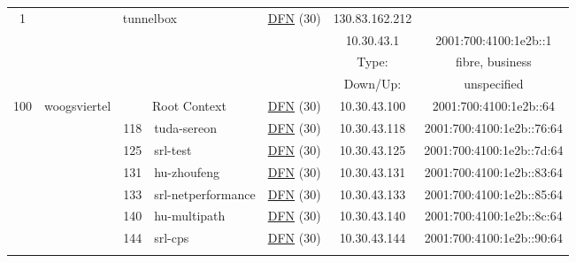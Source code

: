 \begin{small}
\begin{center}
\begin{longtable}{|c|c|c|c|c|c|c|c|}
\endhead
 \multirow{4}{*}{\tiny{1}} & \multicolumn{3}{|c|}{\multirow{4}{*}{\tiny{tunnelbox}}} & \multicolumn{2}{|c|}{\multirow{4}{*}{\tiny{\href{https://www.dfn.de}{DFN} (30)}}} & \tiny{130.83.162.212} & \frownie{} \\* \cline{7-7}\cline{8-8}
  & \multicolumn{3}{|c|}{} & \multicolumn{2}{|c|}{} & \tiny{10.30.43.1} & \tiny{2001:700:4100:1e2b::1} \\* \cline{7-7}\cline{8-8}
  & \multicolumn{3}{|c|}{} & \multicolumn{2}{|c|}{} & Type: & fibre, business \\* \cline{7-7}\cline{8-8}
  & \multicolumn{3}{|c|}{} & \multicolumn{2}{|c|}{} & Down/Up:  & unspecified \\ \hline
 \multirow{19}{*}{\tiny{100}} & \multicolumn{1}{|l|}{\multirow{19}{*}{\tiny{woogsviertel}}} & \multicolumn{2}{|c|}{\tiny{Root Context}} & \multicolumn{2}{|c|}{\tiny{\href{https://www.dfn.de}{DFN} (30)}} & \tiny{10.30.43.100} & \tiny{2001:700:4100:1e2b::64} \\* \cline{3-3}\cline{4-4}\cline{5-5}\cline{6-6}\cline{7-7}\cline{8-8}
  &  & \tiny{118} & \multicolumn{1}{|l|}{\tiny{tuda-sereon}} & \multicolumn{2}{|c|}{\tiny{\href{https://www.dfn.de}{DFN} (30)}} & \tiny{10.30.43.118} & \tiny{2001:700:4100:1e2b::76:64} \\* \cline{3-3}\cline{4-4}\cline{5-5}\cline{6-6}\cline{7-7}\cline{8-8}
  &  & \tiny{125} & \multicolumn{1}{|l|}{\tiny{srl-test}} & \multicolumn{2}{|c|}{\tiny{\href{https://www.dfn.de}{DFN} (30)}} & \tiny{10.30.43.125} & \tiny{2001:700:4100:1e2b::7d:64} \\* \cline{3-3}\cline{4-4}\cline{5-5}\cline{6-6}\cline{7-7}\cline{8-8}
  &  & \tiny{131} & \multicolumn{1}{|l|}{\tiny{hu-zhoufeng}} & \multicolumn{2}{|c|}{\tiny{\href{https://www.dfn.de}{DFN} (30)}} & \tiny{10.30.43.131} & \tiny{2001:700:4100:1e2b::83:64} \\* \cline{3-3}\cline{4-4}\cline{5-5}\cline{6-6}\cline{7-7}\cline{8-8}
  &  & \tiny{133} & \multicolumn{1}{|l|}{\tiny{srl-netperformance}} & \multicolumn{2}{|c|}{\tiny{\href{https://www.dfn.de}{DFN} (30)}} & \tiny{10.30.43.133} & \tiny{2001:700:4100:1e2b::85:64} \\* \cline{3-3}\cline{4-4}\cline{5-5}\cline{6-6}\cline{7-7}\cline{8-8}
  &  & \tiny{140} & \multicolumn{1}{|l|}{\tiny{hu-multipath}} & \multicolumn{2}{|c|}{\tiny{\href{https://www.dfn.de}{DFN} (30)}} & \tiny{10.30.43.140} & \tiny{2001:700:4100:1e2b::8c:64} \\* \cline{3-3}\cline{4-4}\cline{5-5}\cline{6-6}\cline{7-7}\cline{8-8}
  &  & \tiny{144} & \multicolumn{1}{|l|}{\tiny{srl-cps}} & \multicolumn{2}{|c|}{\tiny{\href{https://www.dfn.de}{DFN} (30)}} & \tiny{10.30.43.144} & \tiny{2001:700:4100:1e2b::90:64} \\* \cline{3-3}\cline{4-4}\cline{5-5}\cline{6-6}\cline{7-7}\cline{8-8}

\end{longtable}
\end{center}
\end{small}
